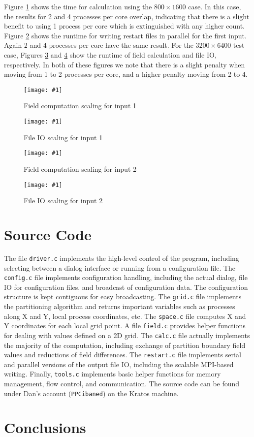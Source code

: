 \documentclass[twocolumn]{article}
\newcommand{\myimage}[3]{
\begin{figure}[!ht]
\caption{#2}
\label{#3}
\texttt{[image: \#1]}
\end{figure}
}
\begin{document}
Figure \ref{fig:calc1} shows the time for calculation using the
$800\times 1600$ case.
In this case, the results for 2 and 4 processes per core overlap,
indicating that there is a slight benefit to using 1 process per core
which is extinguished with any higher count.
Figure \ref{fig:file1} shows the runtime for writing restart files
in parallel for the first input.
Again 2 and 4 processes per core have the same result.
For the $3200\times 6400$ test case, Figures \ref{fig:calc2} and
\ref{fig:file2} show the runtime of field calculation and file IO,
respectively.
In both of these figures we note that there is a slight penalty
when moving from 1 to 2 processes per core, and a higher penalty
moving from 2 to 4.

\myimage{one_calc.png}{Field computation scaling for input 1}{fig:calc1}
\myimage{one_file.png}{File IO scaling for input 1}{fig:file1}
\myimage{two_calc.png}{Field computation scaling for input 2}{fig:calc2}
\myimage{two_file.png}{File IO scaling for input 2}{fig:file2}

\section{Source Code}

The file \texttt{driver.c} implements the high-level control of the program,
including selecting between a dialog interface or running from a configuration
file.
The \texttt{config.c} file implements configuration handling, including
the actual dialog, file IO for configuration files, and broadcast
of configuration data.
The configuration structure is kept contiguous for easy broadcasting.
The \texttt{grid.c} file implements the partitioning algorithm and
returns important variables such as processes along X and Y, local
process coordinates, etc.
The \texttt{space.c} file computes X and Y coordinates for each local
grid point.
A file \texttt{field.c} provides helper functions for dealing with
values defined on a 2D grid.
The \texttt{calc.c} file actually implements the majority of the computation,
including exchange of partition boundary field values and reductions
of field differences.
The \texttt{restart.c} file implements serial and parallel versions
of the output file IO, including the scalable MPI-based writing.
Finally, \texttt{tools.c} implements basic helper functions for
memory management, flow control, and communication.
The source code can be found under Dan's account (\texttt{PPCibaned})
on the Kratos machine.

\section{Conclusions}
\end{document}

